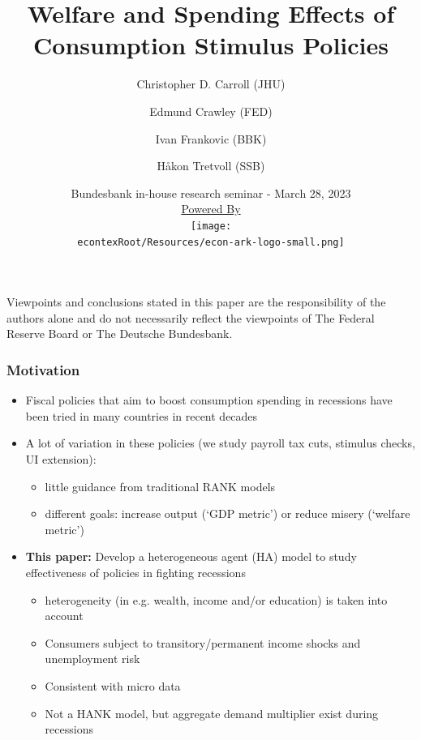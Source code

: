 \documentclass[pdflatex,aspectratio=169]{beamer}
\title[Stimulus]{Welfare and Spending Effects of Consumption Stimulus Policies}
\author{
  Christopher D. Carroll (JHU)
  \and
  Edmund Crawley (FED)
  \and
  Ivan Frankovic (BBK)
  \and
  H{\aa}kon Tretvoll (SSB)
}
\date[\today]{Bundesbank in-house research seminar - March 28, 2023  \\ \medskip \medskip \medskip 
	\href{https://econ-ark.org/}{\small Powered By} \\ \texttt{[image: \\econtexRoot/Resources/econ-ark-logo-small.png]}}
\begin{document}


\begin{frame}[plain]
  \titlepage
  
  \footnotesize{Viewpoints and conclusions stated in this paper are the responsibility of the authors alone and do not necessarily reflect the viewpoints of The Federal Reserve Board or The Deutsche Bundesbank.}
\end{frame}






	
\begin{frame}
\frametitle{Motivation}
\begin{itemize}
	\item Fiscal policies that aim to boost consumption spending in recessions have been tried in many countries in recent decades  
	\item A lot of variation in these policies (we study payroll tax cuts, stimulus checks, UI extension):
	\begin{itemize}
		\itemsep = .25\bigskipamount 
		\item little guidance from traditional RANK models	
		\item different goals: increase output (`GDP metric') or reduce misery (`welfare metric')
	\end{itemize}
	\bigskip
	\pause
	\item \textbf{This paper:} Develop a heterogeneous agent (HA) model to study effectiveness of policies in fighting recessions
	\begin{itemize}
		\itemsep = .25\bigskipamount 
		\item heterogeneity (in e.g. wealth, income and/or education) is taken into account
		\item Consumers subject to transitory/permanent income shocks and unemployment risk
		\item Consistent with micro data
		\item Not a HANK model, but aggregate demand multiplier exist during recessions
	\end{itemize}
\end{itemize}
\end{frame}
\end{document}
